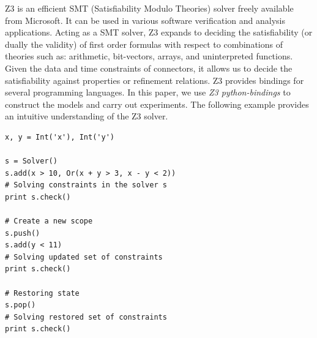 \documentclass[preprint,3p]{elsarticle}
\begin{document}



Z3 \cite{MouraB08} is an efficient SMT (Satisfiability Modulo Theories) solver freely available from Microsoft. It can be used in various software verification and analysis applications. Acting as a SMT solver, Z3 expands to deciding the satisfiability (or dually the validity) of first order formulas with respect to combinations of theories such as: arithmetic, bit-vectors, arrays, and uninterpreted functions. Given the data and time constraints of connectors, it allows us to decide the satisfiability against properties or refinement relations. Z3 provides bindings for several programming languages. In this paper, we use \emph{Z3 python-bindings} to construct the models and carry out experiments. The following example provides an intuitive understanding of the Z3 solver.
\begin{lstlisting}
x, y = Int('x'), Int('y')

s = Solver()
s.add(x > 10, Or(x + y > 3, x - y < 2))
# Solving constraints in the solver s
print s.check()

# Create a new scope
s.push()
s.add(y < 11)
# Solving updated set of constraints
print s.check()

# Restoring state
s.pop()
# Solving restored set of constraints
print s.check()
\end{lstlisting}
\end{document}
